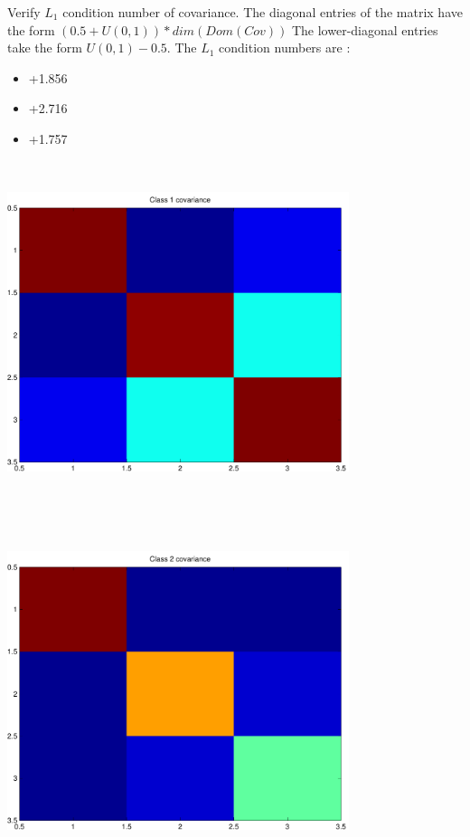 \documentclass[9pt]{article}
\theoremstyle{plain}
\theoremstyle{definition}
\theoremstyle{remark}
\numberwithin{equation}{section}
\begin{document}
Verify $L_1$ condition number of covariance. The diagonal entries of the matrix have the form $(0.5 + U(0,1) )*dim(Dom(Cov))$
The lower-diagonal entries take the form $U(0,1) - 0.5$. 
The $L_1$ condition numbers are :
\begin{itemize}
\item +1.856
\item +2.716
\item +1.757
\end{itemize}
\includegraphics[width=10.0cm,height=10.0cm]{rv1_corr.pdf}

\includegraphics[width=10.0cm,height=10.0cm]{rv2_corr.pdf}
\end{document}
